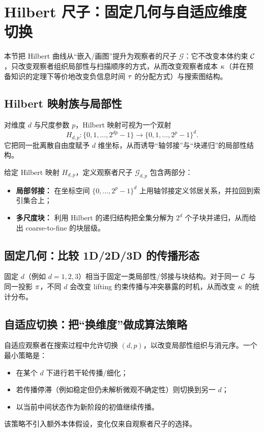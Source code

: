 \section{Hilbert 尺子：固定几何与自适应维度切换}

本节把 Hilbert 曲线从“嵌入/画图”提升为观察者的尺子 \(\mathcal G\)：它不改变本体约束 \(\mathcal{C}\)，只改变观察者组织局部性与扫描顺序的方式，从而改变观察者成本 \(\kappa\)（并在预备知识的定理下等价地改变负信息时间 \(\tau\) 的分配方式）与搜索图结构。

\subsection{Hilbert 映射族与局部性}

对维度 \(d\) 与尺度参数 \(p\)，Hilbert 映射可视为一个双射
\[
H_{d,p}:\{0,1,\dots,2^{dp}-1\}\to \{0,1,\dots,2^p-1\}^d.
\]
它把同一批离散自由度赋予 \(d\) 维坐标，从而诱导“轴邻接”与“块递归”的局部性结构。

\begin{definition}
给定 Hilbert 映射 \(H_{d,p}\)，定义观察者尺子 \(\mathcal G_{d,p}\) 包含两部分：
\begin{itemize}
  \item \textbf{局部邻接：} 在坐标空间 \(\{0,\dots,2^p-1\}^d\) 上用轴邻接定义邻居关系，并拉回到索引集合上；
  \item \textbf{多尺度块：} 利用 Hilbert 的递归结构把全集分解为 \(2^d\) 个子块并递归，从而给出 coarse-to-fine 的块层级。
\end{itemize}
\end{definition}

\subsection{固定几何：比较 1D/2D/3D 的传播形态}

固定 \(d\)（例如 \(d=1,2,3\)）相当于固定一类局部性/邻接与块结构。对于同一 \(\mathcal{C}\) 与同一投影 \(\pi\)，不同 \(d\) 会改变 lifting 约束传播与冲突暴露的时机，从而改变 \(\kappa\) 的统计分布。

\subsection{自适应切换：把“换维度”做成算法策略}

自适应观察者在搜索过程中允许切换 \((d,p)\)，以改变局部性组织与消元序。一个最小策略是：
\begin{itemize}
  \item 在某个 \(d\) 下进行若干轮传播/细化；
  \item 若传播停滞（例如稳定但仍未解析微观不确定性）则切换到另一 \(d\)；
  \item 以当前中间状态作为新阶段的初值继续传播。
\end{itemize}
该策略不引入额外本体假设，变化仅来自观察者尺子的选择。

